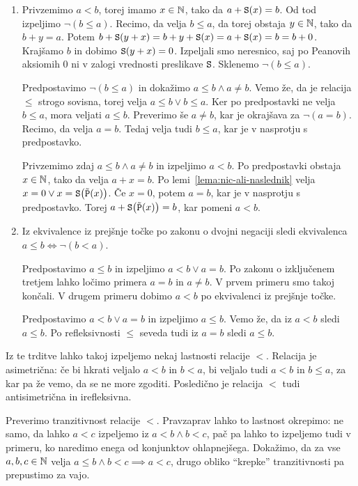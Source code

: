 \begin{dokaz}
\begin{enumerate}
\item
Privzemimo $a < b$, torej imamo $x \in \mathbb{N}$, tako da $a + \mathtt{S}(x) = b$. Od tod izpeljimo $\lnot(b \leq a)$. Recimo, da velja $b \leq a$, da torej obstaja $y \in \mathbb{N}$, tako da $b + y = a$. Potem $b + \mathtt{S}(y + x) = b + y + \mathtt{S}(x) = a + \mathtt{S}(x) = b = b + 0$. Krajšamo $b$ in dobimo $\mathtt{S}(y + x) = 0$. Izpeljali smo neresnico, saj po Peanovih aksiomih $0$ ni v zalogi vrednosti preslikave $\mathtt{S}$. Sklenemo $\lnot(b \leq a)$.

Predpostavimo $\lnot(b \leq a)$ in dokažimo $a \leq b \land a \neq b$. Vemo že, da je relacija $\leq$ strogo sovisna, torej velja $a \leq b \lor b \leq a$. Ker po predpostavki ne velja $b \leq a$, mora veljati $a \leq b$. Preverimo še $a \neq b$, kar je okrajšava za $\lnot(a = b)$. Recimo, da velja $a = b$. Tedaj velja tudi $b \leq a$, kar je v nasprotju s predpostavko.

Privzemimo zdaj $a \leq b \land a \neq b$ in izpeljimo $a < b$. Po predpostavki obstaja $x \in \mathbb{N}$, tako da velja $a + x = b$. Po lemi~\ref{lema:nic-ali-naslednik} velja $x = 0 \lor x = \mathtt{S}\big(\tilde{\mathtt{P}}(x)\big)$. Če $x = 0$, potem $a = b$, kar je v nasprotju s predpostavko. Torej $a + \mathtt{S}\big(\tilde{\mathtt{P}}(x)\big) = b$, kar pomeni $a < b$.
\item
Iz ekvivalence iz prejšnje točke po zakonu o dvojni negaciji sledi ekvivalenca $a \leq b \iff \lnot(b < a)$.

Predpostavimo $a \leq b$ in izpeljimo $a < b \lor a = b$. Po zakonu o izključenem tretjem lahko ločimo primera $a = b$ in $a \neq b$. V prvem primeru smo takoj končali. V drugem primeru dobimo $a < b$ po ekvivalenci iz prejšnje točke.

Predpostavimo $a < b \lor a = b$ in izpeljimo $a \leq b$. Vemo že, da iz $a < b$ sledi $a \leq b$. Po refleksivnosti $\leq$ seveda tudi iz $a = b$ sledi $a \leq b$.
\end{enumerate}
\end{dokaz}

Iz te trditve lahko takoj izpeljemo nekaj lastnosti relacije $<$. Relacija je asimetrična: če bi hkrati veljalo $a < b$ in $b < a$, bi veljalo tudi $a < b$ in $b \leq a$, za kar pa že vemo, da se ne more zgoditi. Posledično je relacija $<$ tudi antisimetrična in irefleksivna. 

Preverimo tranzitivnost relacije $<$. Pravzaprav lahko to lastnost okrepimo: ne samo, da lahko $a < c$ izpeljemo iz $a < b \land b < c$, pač pa lahko to izpeljemo tudi v primeru, ko naredimo enega od konjunktov ohlapnejšega. Dokažimo, da za vse $a, b, c \in \mathbb{N}$ velja $a \leq b \land b < c \implies a < c$, drugo obliko ``krepke'' tranzitivnosti pa prepustimo za vajo.

